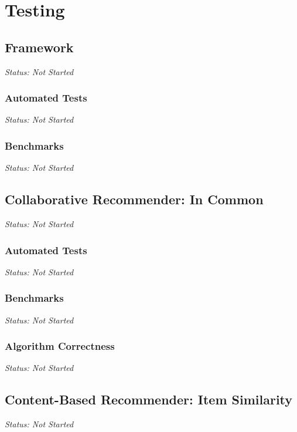 \chapter{Testing}

\section{Framework}

\emph{Status: Not Started}

\subsection{Automated Tests}

\emph{Status: Not Started}

\subsection{Benchmarks}

\emph{Status: Not Started}

\section{Collaborative Recommender: In Common}

\emph{Status: Not Started}

\subsection{Automated Tests}

\emph{Status: Not Started}

\subsection{Benchmarks}

\emph{Status: Not Started}

\subsection{Algorithm Correctness}

\emph{Status: Not Started}

\section{Content-Based Recommender: Item Similarity}

\emph{Status: Not Started}

